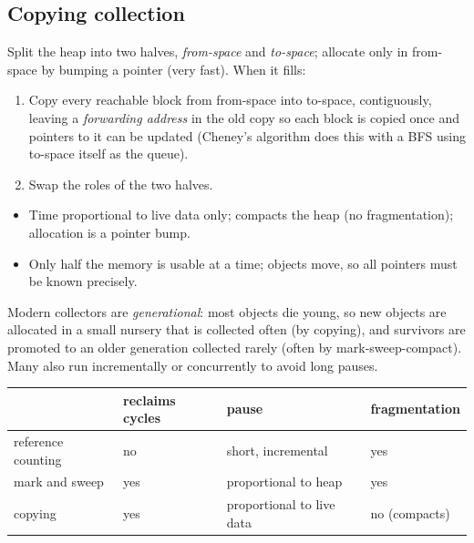 \subsection{Copying collection}
Split the heap into two halves, \emph{from-space} and \emph{to-space}; allocate only in
from-space by bumping a pointer (very fast). When it fills:
\begin{enumerate}
  \item Copy every reachable block from from-space into to-space, contiguously, leaving a
        \emph{forwarding address} in the old copy so each block is copied once and pointers
        to it can be updated (Cheney's algorithm does this with a BFS using to-space itself as
        the queue).
  \item Swap the roles of the two halves.
\end{enumerate}
\begin{itemize}
  \item[+] Time proportional to live data only; compacts the heap (no fragmentation);
        allocation is a pointer bump.
  \item[$-$] Only half the memory is usable at a time; objects move, so all pointers must be
        known precisely.
\end{itemize}

\begin{aside}
Modern collectors are \emph{generational}: most objects die young, so new objects are
allocated in a small nursery that is collected often (by copying), and survivors are
promoted to an older generation collected rarely (often by mark-sweep-compact). Many also run
incrementally or concurrently to avoid long pauses.
\end{aside}

\begin{center}
\begin{tabular}{llll}
\toprule
 & reclaims cycles & pause & fragmentation \\
\midrule
reference counting & no & short, incremental & yes \\
mark and sweep & yes & proportional to heap & yes \\
copying & yes & proportional to live data & no (compacts) \\
\bottomrule
\end{tabular}
\end{center}


